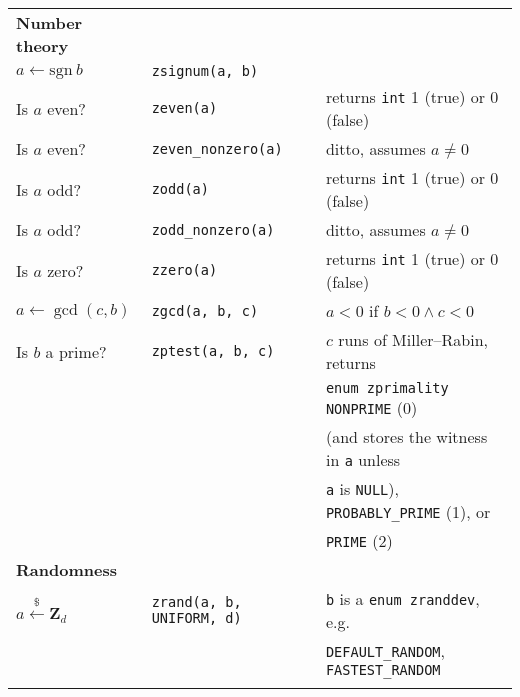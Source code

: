 \documentclass[10pt]{article}
\newcommand{\entry}[3]{ #2 & {\tt #1} & #3 \\ }
\newcommand{\cont}[1]{ & & #1 \\ }
\begin{document}
\begin{tabular}{lll}
\textbf{Number theory} \\
\entry{zsignum(a, b)}     {$a \gets \mbox{sgn}~b$} {}
\entry{zeven(a)}          {Is $a$ even?}           {returns {\tt int} 1 (true) or 0 (false)}
\entry{zeven\_nonzero(a)} {Is $a$ even?}           {ditto, assumes $a \neq 0$}
\entry{zodd(a)}           {Is $a$ odd?}            {returns {\tt int} 1 (true) or 0 (false)}
\entry{zodd\_nonzero(a)}  {Is $a$ odd?}            {ditto, assumes $a \neq 0$}
\entry{zzero(a)}          {Is $a$ zero?}           {returns {\tt int} 1 (true) or 0 (false)}
\entry{zgcd(a, b, c)}     {$a \gets \gcd(c, b)$}   {$a < 0$ if $b < 0 \wedge c < 0$}
\entry{zptest(a, b, c)}   {Is $b$ a prime?}        {$c$ runs of Miller--Rabin, returns}
\cont                                              {{\tt enum zprimality} {\tt NONPRIME} (0)}
\cont                                              {(and stores the witness in {\tt a} unless}
\cont                                              {{\tt a} is {\tt NULL}), {\tt PROBABLY\_PRIME} (1), or}
\cont                                              {{\tt PRIME} (2)}

\textbf{Randomness} \\
\entry{zrand(a, b, UNIFORM, d)} {$a \xleftarrow{\$} \textbf{Z}_d$}
      {{\tt b} is a {\tt enum zranddev}, e.g.}
\cont {{\tt DEFAULT\_RANDOM}, {\tt FASTEST\_RANDOM}}
\\



\end{tabular}
\end{document}
